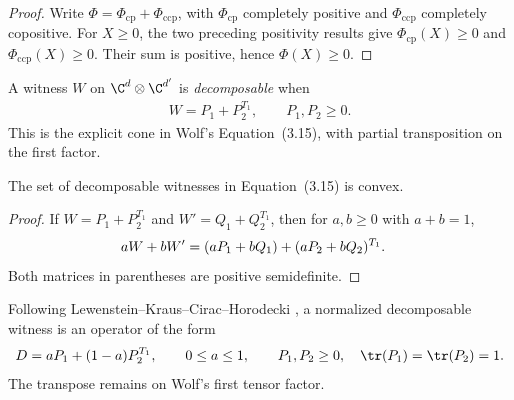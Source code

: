 \begin{proof}
    \leanok
    Write $\Phi=\Phi_{\mathrm{cp}}+\Phi_{\mathrm{ccp}}$, with
    $\Phi_{\mathrm{cp}}$ completely positive and
    $\Phi_{\mathrm{ccp}}$ completely copositive. For $X\ge0$, the two preceding
    positivity results give $\Phi_{\mathrm{cp}}(X)\ge0$ and
    $\Phi_{\mathrm{ccp}}(X)\ge0$. Their sum is positive, hence
    $\Phi(X)\ge0$.
\end{proof}

\begin{definition}
    \label{def:decomposable_witness}
    \leanok
    A witness $W$ on $\C^d\otimes\C^{d'}$ is \emph{decomposable} when
    \begin{align}
        W=P_1+P_2^{T_1},\qquad P_1,P_2\geq0.
        \tag{Wolf 3.15}
    \end{align}
    This is the explicit cone in Wolf's Equation~(3.15), with partial
    transposition on the first factor.
\end{definition}

\begin{theorem}
    \label{thm:decomposable_witness_convex}
    \leanok
    The set of decomposable witnesses in Equation~(3.15) is convex.
\end{theorem}

\begin{proof}
    \leanok
    If $W=P_1+P_2^{T_1}$ and $W'=Q_1+Q_2^{T_1}$, then for
    $a,b\geq0$ with $a+b=1$,
    \begin{align}
        aW+bW'
        &=(aP_1+bQ_1)+(aP_2+bQ_2)^{T_1}.
        \notag
    \end{align}
    Both matrices in parentheses are positive semidefinite.
\end{proof}

\begin{definition}
    \label{def:normalized_decomposable_witness}
    \leanok
    Following Lewenstein--Kraus--Cirac--Horodecki
    \cite{LewensteinKrausCiracHorodecki2000}, a normalized decomposable witness is
    an operator of the form
    \begin{align}
        D=aP_1+(1-a)P_2^{T_1},\qquad 0\leq a\leq1,
        \qquad P_1,P_2\geq0,\quad
        \tr(P_1)=\tr(P_2)=1.
        \notag
    \end{align}
    The transpose remains on Wolf's first tensor factor.
\end{definition}

